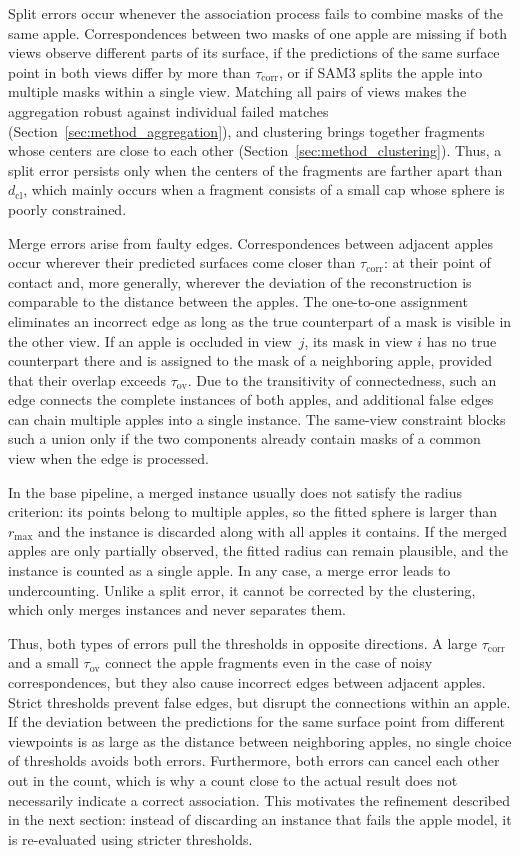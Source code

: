 \documentclass[english, egger, bsc]{vcethesis}
\begin{document}
Split errors occur whenever the association process fails to combine masks of the same apple. Correspondences between two masks of one apple are missing if both views observe different parts of its surface, if the predictions of the same surface point in both views differ by more than $\tau_{\mathrm{corr}}$, or if SAM3 splits the apple into multiple masks within a single view. Matching all pairs of views makes the aggregation robust against individual failed matches (Section~\ref{sec:method_aggregation}), and clustering brings together fragments whose centers are close to each other (Section~\ref{sec:method_clustering}). Thus, a split error persists only when the centers of the fragments are farther apart than $d_{\mathrm{cl}}$, which mainly occurs when a fragment consists of a small cap whose sphere is poorly constrained.

Merge errors arise from faulty edges. Correspondences between adjacent apples occur wherever their predicted surfaces come closer than $\tau_{\mathrm{corr}}$: at their point of contact and, more generally, wherever the deviation of the reconstruction is comparable to the distance between the apples. The one-to-one assignment eliminates an incorrect edge as long as the true counterpart of a mask is visible in the other view. If an apple is occluded in view~$j$, its mask in view $i$ has no true counterpart there and is assigned to the mask of a neighboring apple, provided that their overlap exceeds $\tau_{\mathrm{ov}}$. Due to the transitivity of connectedness, such an edge connects the complete instances of both apples, and additional false edges can chain multiple apples into a single instance. The same-view constraint blocks such a union only if the two components already contain masks of a common view when the edge is processed.

In the base pipeline, a merged instance usually does not satisfy the radius criterion: its points belong to multiple apples, so the fitted sphere is larger than $r_{\max}$ and the instance is discarded along with all apples it contains. If the merged apples are only partially observed, the fitted radius can remain plausible, and the instance is counted as a single apple. In any case, a merge error leads to undercounting. Unlike a split error, it cannot be corrected by the clustering, which only merges instances and never separates them.

Thus, both types of errors pull the thresholds in opposite directions. A large $\tau_{\mathrm{corr}}$ and a small $\tau_{\mathrm{ov}}$ connect the apple fragments even in the case of noisy correspondences, but they also cause incorrect edges between adjacent apples. Strict thresholds prevent false edges, but disrupt the connections within an apple. If the deviation between the predictions for the same surface point from different viewpoints is as large as the distance between neighboring apples, no single choice of thresholds avoids both errors. Furthermore, both errors can cancel each other out in the count, which is why a count close to the actual result does not necessarily indicate a correct association. This motivates the refinement described in the next section: instead of discarding an instance that fails the apple model, it is re-evaluated using stricter thresholds.
\end{document}
